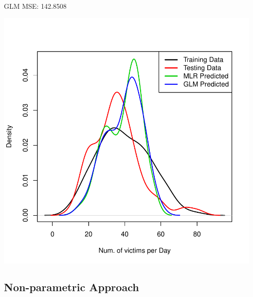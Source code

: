 \documentclass[11pt, a4paper]{article}
\begin{document}
\begin{Schunk}
\begin{Soutput}
GLM MSE: 142.8508
\end{Soutput}
\end{Schunk}
\includegraphics{regression-034}





\pagebreak
\subsection{Non-parametric Approach}
\end{document}
